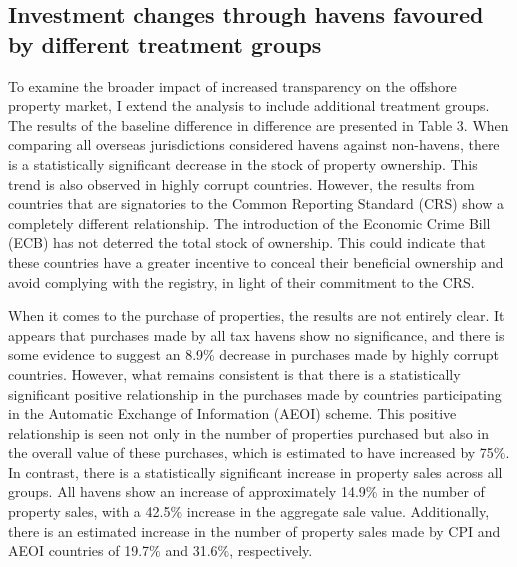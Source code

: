 \documentclass{article}
\begin{document}
\subsection{Investment changes through havens favoured by different treatment groups}
To examine the broader impact of increased transparency on the offshore property market, I extend the analysis to include additional treatment groups. The results of the baseline difference in difference are presented in Table 3. When comparing all overseas jurisdictions considered havens against non-havens, there is a statistically significant decrease in the stock of property ownership. This trend is also observed in highly corrupt countries. However, the results from countries that are signatories to the Common Reporting Standard (CRS) show a completely different relationship. The introduction of the Economic Crime Bill (ECB) has not deterred the total stock of ownership. This could indicate that these countries have a greater incentive to conceal their beneficial ownership and avoid complying with the registry, in light of their commitment to the CRS.

When it comes to the purchase of properties, the results are not entirely clear. It appears that purchases made by all tax havens show no significance, and there is some evidence to suggest an 8.9{\%} decrease in purchases made by highly corrupt countries. However, what remains consistent is that there is a statistically significant positive relationship in the purchases made by countries participating in the Automatic Exchange of Information (AEOI) scheme. This positive relationship is seen not only in the number of properties purchased but also in the overall value of these purchases, which is estimated to have increased by 75${\%}$. In contrast, there is a statistically significant increase in property sales across all groups. All havens show an increase of approximately 14.9${\%}$ in the number of property sales, with a 42.5${\%}$ increase in the aggregate sale value. Additionally, there is an estimated increase in the number of property sales made by CPI and AEOI countries of 19.7${\%}$ and 31.6${\%}$, respectively.
\end{document}
